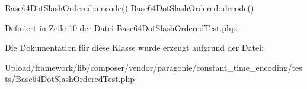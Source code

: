 Base64\+Dot\+Slash\+Ordered\+::encode()  Base64\+Dot\+Slash\+Ordered\+::decode() 

Definiert in Zeile 10 der Datei Base64\+Dot\+Slash\+Ordered\+Test.\+php.



Die Dokumentation für diese Klasse wurde erzeugt aufgrund der Datei\+:\begin{DoxyCompactItemize}
\item 
Upload/framework/lib/composer/vendor/paragonie/constant\+\_\+time\+\_\+encoding/tests/Base64\+Dot\+Slash\+Ordered\+Test.\+php\end{DoxyCompactItemize}
